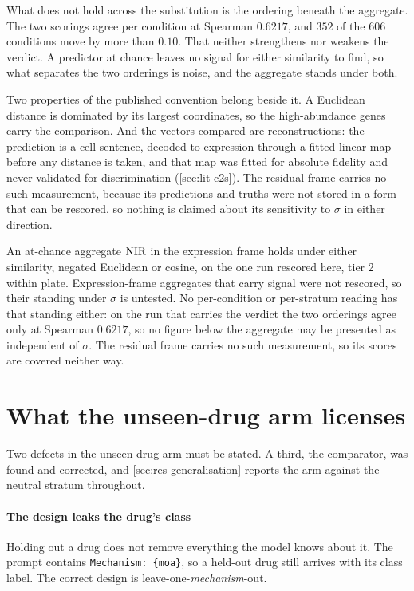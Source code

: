What does not hold across the substitution is the ordering beneath the
aggregate. The two scorings agree per condition at Spearman $0.6217$, and $352$
of the $606$ conditions move by more than $0.10$. That neither strengthens nor
weakens the verdict. A predictor at chance leaves no signal for either
similarity to find, so what separates the two orderings is noise, and the
aggregate stands under both.

Two properties of the published convention belong beside it. A Euclidean
distance is dominated by its largest coordinates, so the high-abundance genes
carry the comparison. And the vectors compared are reconstructions: the
prediction is a cell sentence, decoded to expression through a fitted linear map
before any distance is taken, and that map was fitted for absolute fidelity and
never validated for discrimination (\cref{sec:lit-c2s}). The residual frame
carries no such measurement, because its predictions and truths were not stored
in a form that can be rescored, so nothing is claimed about its sensitivity to
$\sigma$ in either direction.

\begin{scopelimit}
An at-chance aggregate $\textrm{NIR}$ in the expression frame holds under either
similarity, negated Euclidean or cosine, on the one run rescored here, tier 2
within plate. Expression-frame aggregates that carry signal were not rescored,
so their standing under $\sigma$ is untested. No per-condition or per-stratum
reading has that standing either: on the run that carries the verdict the two
orderings agree only at Spearman $0.6217$, so no figure below the aggregate may
be presented as independent of $\sigma$. The residual frame carries no such
measurement, so its scores are covered neither way.
\end{scopelimit}

\section{What the unseen-drug arm licenses}
\label{sec:lim-unseen}

Two defects in the unseen-drug arm must be stated. A third, the comparator, was
found and corrected, and \cref{sec:res-generalisation} reports the arm against
the neutral stratum throughout.

\paragraph{The design leaks the drug's class} Holding out a drug does not
remove everything the model knows about it. The prompt contains
\texttt{Mechanism: \{moa\}}, so a held-out drug still arrives with its class
label. The correct design is leave-one-\emph{mechanism}-out.

